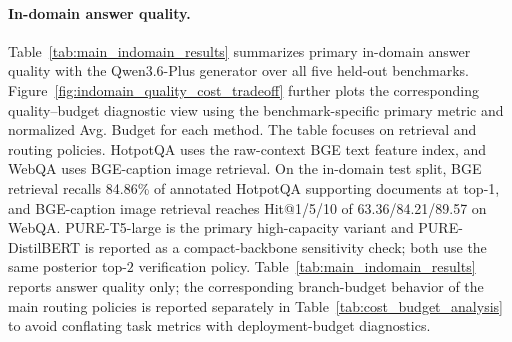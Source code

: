 \documentclass[a4paper,fleqn]{cas-dc}
\begin{document}
\paragraph{In-domain answer quality.}
Table~\ref{tab:main_indomain_results} summarizes primary in-domain answer quality with the Qwen3.6-Plus generator over all five held-out benchmarks. Figure~\ref{fig:indomain_quality_cost_tradeoff} further plots the corresponding quality--budget diagnostic view using the benchmark-specific primary metric and normalized Avg. Budget for each method. The table focuses on retrieval and routing policies. HotpotQA uses the raw-context BGE text feature index, and WebQA uses BGE-caption image retrieval. On the in-domain test split, BGE retrieval recalls 84.86\% of annotated HotpotQA supporting documents at top-1, and BGE-caption image retrieval reaches Hit@1/5/10 of 63.36/84.21/89.57 on WebQA. PURE-T5-large is the primary high-capacity variant and PURE-DistilBERT is reported as a compact-backbone sensitivity check; both use the same posterior top-$2$ verification policy. Table~\ref{tab:main_indomain_results} reports answer quality only; the corresponding branch-budget behavior of the main routing policies is reported separately in Table~\ref{tab:cost_budget_analysis} to avoid conflating task metrics with deployment-budget diagnostics.
\end{document}
